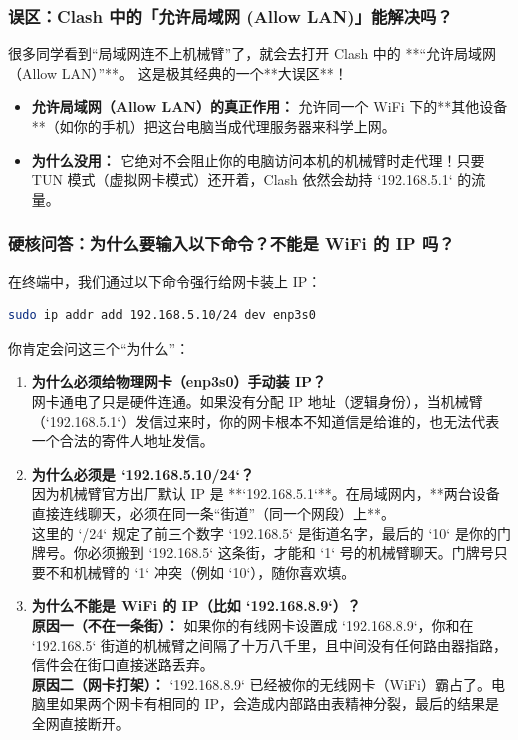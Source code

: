 \documentclass[12pt,a4paper]{ctexart}
\begin{document}
\subsubsection{误区：Clash 中的「允许局域网 (Allow LAN)」能解决吗？}
很多同学看到“局域网连不上机械臂”了，就会去打开 Clash 中的 **“允许局域网（Allow LAN）”**。
这是极其经典的一个**大误区**！
\begin{itemize}
    \item \textbf{允许局域网（Allow LAN）的真正作用：} 允许同一个 WiFi 下的**其他设备**（如你的手机）把这台电脑当成代理服务器来科学上网。
    \item \textbf{为什么没用：} 它绝对不会阻止你的电脑访问本机的机械臂时走代理！只要 TUN 模式（虚拟网卡模式）还开着，Clash 依然会劫持 `192.168.5.1` 的流量。
\end{itemize}

\subsubsection{硬核问答：为什么要输入以下命令？不能是 WiFi 的 IP 吗？}
在终端中，我们通过以下命令强行给网卡装上 IP：
\begin{lstlisting}[language=bash]
sudo ip addr add 192.168.5.10/24 dev enp3s0
\end{lstlisting}

你肯定会问这三个“为什么”：
\begin{enumerate}
    \item \textbf{为什么必须给物理网卡（enp3s0）手动装 IP？} \\
    网卡通电了只是硬件连通。如果没有分配 IP 地址（逻辑身份），当机械臂（`192.168.5.1`）发信过来时，你的网卡根本不知道信是给谁的，也无法代表一个合法的寄件人地址发信。
    \item \textbf{为什么必须是 `192.168.5.10/24`？} \\
    因为机械臂官方出厂默认 IP 是 **`192.168.5.1`**。在局域网内，**两台设备直接连线聊天，必须在同一条“街道”（同一个网段）上**。 \\
    这里的 `/24` 规定了前三个数字 `192.168.5` 是街道名字，最后的 `10` 是你的门牌号。你必须搬到 `192.168.5` 这条街，才能和 `1` 号的机械臂聊天。门牌号只要不和机械臂的 `1` 冲突（例如 `10`），随你喜欢填。
    \item \textbf{为什么不能是 WiFi 的 IP（比如 `192.168.8.9`）？} \\
    \textbf{原因一（不在一条街）：} 如果你的有线网卡设置成 `192.168.8.9`，你和在 `192.168.5` 街道的机械臂之间隔了十万八千里，且中间没有任何路由器指路，信件会在街口直接迷路丢弃。 \\
    \textbf{原因二（网卡打架）：} `192.168.8.9` 已经被你的无线网卡（WiFi）霸占了。电脑里如果两个网卡有相同的 IP，会造成内部路由表精神分裂，最后的结果是全网直接断开。
\end{enumerate}
\end{document}
